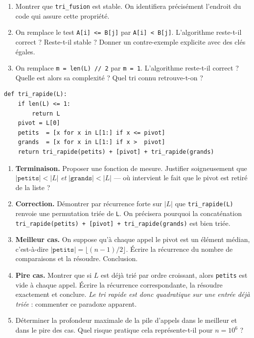\documentclass[11pt,a4paper]{article}
\begin{document}
\begin{enumerate}[label=\arabic*.,leftmargin=*]
  \item Montrer que \texttt{tri\_fusion} est stable. On identifiera précisément
        l'endroit du code qui assure cette propriété.
  \item On remplace le test \texttt{A[i] <= B[j]} par \texttt{A[i] < B[j]}.
        L'algorithme reste-t-il correct ? Reste-t-il stable ? Donner un contre-exemple
        explicite avec des clés égales.
  \item On remplace \texttt{m = len(L) // 2} par \texttt{m = 1}. L'algorithme
        reste-t-il correct ? Quelle est alors sa complexité ? Quel tri connu
        retrouve-t-on ?
\end{enumerate}


\begin{lstlisting}
def tri_rapide(L):
    if len(L) <= 1:
        return L
    pivot = L[0]
    petits  = [x for x in L[1:] if x <= pivot]
    grands  = [x for x in L[1:] if x >  pivot]
    return tri_rapide(petits) + [pivot] + tri_rapide(grands)
\end{lstlisting}

\begin{enumerate}[label=\arabic*.,leftmargin=*]
  \item \textbf{Terminaison.} Proposer une fonction de mesure. Justifier soigneusement
        que $|\texttt{petits}|<|L|$ \emph{et} $|\texttt{grands}|<|L|$ --- où intervient
        le fait que le pivot est retiré de la liste ?
  \item \textbf{Correction.} Démontrer par récurrence forte sur $|L|$ que
        \texttt{tri\_rapide(L)} renvoie une permutation triée de \texttt{L}.
        On précisera pourquoi la concaténation
        \texttt{tri\_rapide(petits) + [pivot] + tri\_rapide(grands)} est bien triée.
  \item \textbf{Meilleur cas.} On suppose qu'à chaque appel le pivot est un élément
        médian, c'est-à-dire $|\texttt{petits}|=\lfloor (n-1)/2\rfloor$. Écrire la
        récurrence du nombre de comparaisons et la résoudre. Conclusion.
  \item \textbf{Pire cas.} Montrer que si $L$ est déjà trié par ordre croissant, alors
        \texttt{petits} est vide à chaque appel. Écrire la récurrence
        correspondante, la résoudre exactement et conclure.
        \emph{Le tri rapide est donc quadratique sur une entrée déjà triée} :
        commenter ce paradoxe apparent.
  \item Déterminer la profondeur maximale de la pile d'appels dans le meilleur et dans
        le pire des cas. Quel risque pratique cela représente-t-il pour $n=10^{6}$ ?
\end{enumerate}
\end{document}
